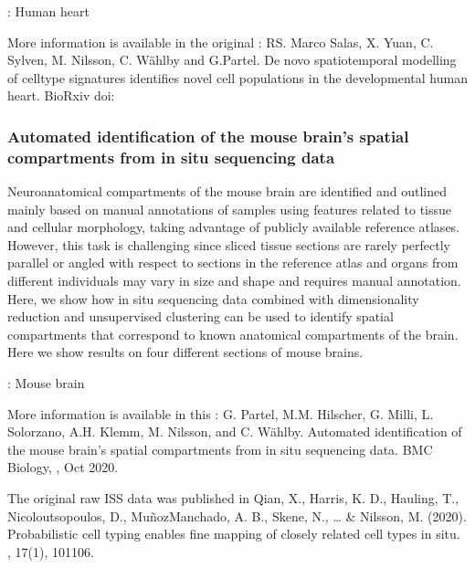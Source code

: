 \documentclass[letterpaper,10pt,english,openany,oneside]{sphinxmanual}
\begin{document}
\sphinxAtStartPar
{}

\sphinxAtStartPar
{}:
Human heart

\sphinxAtStartPar
More information is available in the original : RS. Marco Salas, X. Yuan,  C. Sylven,  M. Nilsson,  C. Wählby and  G.Partel. De novo spatiotemporal modelling of cell\sphinxhyphen{}type signatures identifies novel cell populations in the developmental human heart. BioRxiv doi: 


\subsubsection{Automated identification of the mouse brain’s spatial compartments from in situ sequencing data}
\label{\detokenize{docs/starting/projects:automated-identification-of-the-mouse-brain-s-spatial-compartments-from-in-situ-sequencing-data}}
\sphinxAtStartPar
Neuroanatomical compartments of the mouse brain are identified and outlined mainly based on manual annotations of samples using features related to tissue and cellular morphology, taking advantage of publicly available reference atlases. However, this task is challenging since sliced tissue sections are rarely perfectly parallel or angled with respect to sections in the reference atlas and organs from different individuals may vary in size and shape and requires manual annotation. Here, we show how in situ sequencing data combined with dimensionality reduction and unsupervised clustering can be used to identify spatial compartments that correspond to known anatomical compartments of the brain. Here we show results on four different sections of mouse brains.

\sphinxAtStartPar
{}

\sphinxAtStartPar
{}:
Mouse brain

\sphinxAtStartPar
More information is available in this : G. Partel, M.M. Hilscher, G. Milli, L. Solorzano, A.H. Klemm, M. Nilsson, and C. Wählby.  Automated identification of the mouse brain’s spatial compartments from in situ sequencing data.  BMC Biology, , Oct 2020.

\sphinxAtStartPar
The original raw ISS data was published in Qian, X., Harris, K. D., Hauling, T., Nicoloutsopoulos, D., Muñoz\sphinxhyphen{}Manchado, A. B., Skene, N., … \& Nilsson, M. (2020). Probabilistic cell typing enables fine mapping of closely related cell types in situ. , 17(1), 101\sphinxhyphen{}106.
\end{document}
